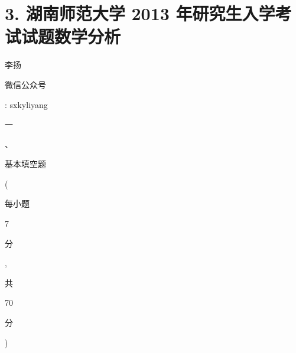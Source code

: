 \documentclass[10pt]{article}
\begin{document}
\section{3. 湖南师范大学 2013 年研究生入学考试试题数学分析}
\begin{CJK}{UTF8}{mj}李扬\end{CJK}

\begin{CJK}{UTF8}{mj}微信公众号\end{CJK}: sxkyliyang

\begin{CJK}{UTF8}{mj}一\end{CJK}、\begin{CJK}{UTF8}{mj}基本填空题\end{CJK}(\begin{CJK}{UTF8}{mj}每小题\end{CJK} 7 \begin{CJK}{UTF8}{mj}分\end{CJK}, \begin{CJK}{UTF8}{mj}共\end{CJK} 70 \begin{CJK}{UTF8}{mj}分\end{CJK})
\end{document}
